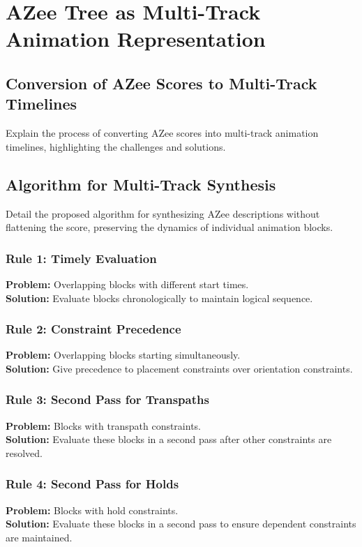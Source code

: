 \section{AZee Tree as Multi-Track Animation Representation}
\subsection{Conversion of AZee Scores to Multi-Track Timelines}
Explain the process of converting AZee scores into multi-track animation timelines, highlighting the challenges and solutions.

\subsection{Algorithm for Multi-Track Synthesis}
Detail the proposed algorithm for synthesizing AZee descriptions without flattening the score, preserving the dynamics of individual animation blocks.

\subsubsection{Rule 1: Timely Evaluation}
\textbf{Problem:} Overlapping blocks with different start times.\\
\textbf{Solution:} Evaluate blocks chronologically to maintain logical sequence.

\subsubsection{Rule 2: Constraint Precedence}
\textbf{Problem:} Overlapping blocks starting simultaneously.\\
\textbf{Solution:} Give precedence to placement constraints over orientation constraints.

\subsubsection{Rule 3: Second Pass for Transpaths}
\textbf{Problem:} Blocks with transpath constraints.\\
\textbf{Solution:} Evaluate these blocks in a second pass after other constraints are resolved.

\subsubsection{Rule 4: Second Pass for Holds}
\textbf{Problem:} Blocks with hold constraints.\\
\textbf{Solution:} Evaluate these blocks in a second pass to ensure dependent constraints are maintained.

